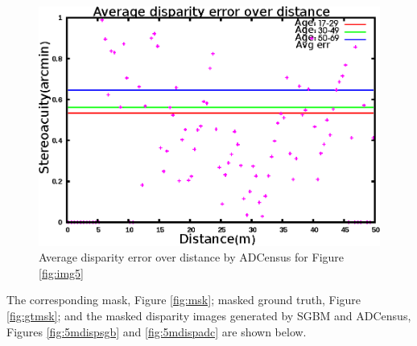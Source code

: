 \begin{figure}[H]
\centering
\includegraphics[scale=0.95]{adcimg5pix3msk}
\caption{Average disparity error over distance by ADCensus for Figure \protect\ref{fig:img5}}
\label{fig:imgfull5}
\end{figure}

\noindent
The corresponding mask, Figure \ref{fig:msk}; masked ground truth, Figure \ref{fig:gtmsk}; and
the masked disparity images generated by SGBM and ADCensus, Figures \ref{fig:5mdispsgb} and \ref{fig:5mdispadc} 
are shown below.

